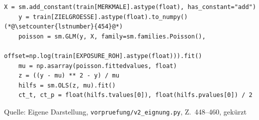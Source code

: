 \documentclass[12pt,a4paper]{article}
\newcommand{\tabquelle}[1][Eigene Darstellung]{%
  \par\setlength{\parskip}{0pt}\vspace{3pt}%
  {\setstretch{1}\fontsize{9pt}{11pt}\selectfont\raggedright Quelle: #1\par}%
}
\begin{document}
\begin{quellcode}[htbp]
\caption{Überdispersionstest als Hilfsregression}
\label{lst:dispersionstest}\vspace{-3.5pt}
\begin{lstlisting}[style=pythonstil,firstnumber=448]
    X = sm.add_constant(train[MERKMALE].astype(float), has_constant="add")
    y = train[ZIELGROESSE].astype(float).to_numpy()(*@\setcounter{lstnumber}{454}@*)
    poisson = sm.GLM(y, X, family=sm.families.Poisson(),
                     offset=np.log(train[EXPOSURE_ROH].astype(float))).fit()
    mu = np.asarray(poisson.fittedvalues, float)
    z = ((y - mu) ** 2 - y) / mu
    hilfs = sm.OLS(z, mu).fit()
    ct_t, ct_p = float(hilfs.tvalues[0]), float(hilfs.pvalues[0]) / 2
\end{lstlisting}
\tabquelle[Eigene Darstellung, \texttt{vorpruefung/v2\_eignung.py}, Z.~448--460, gekürzt]
\end{quellcode}
\end{document}
